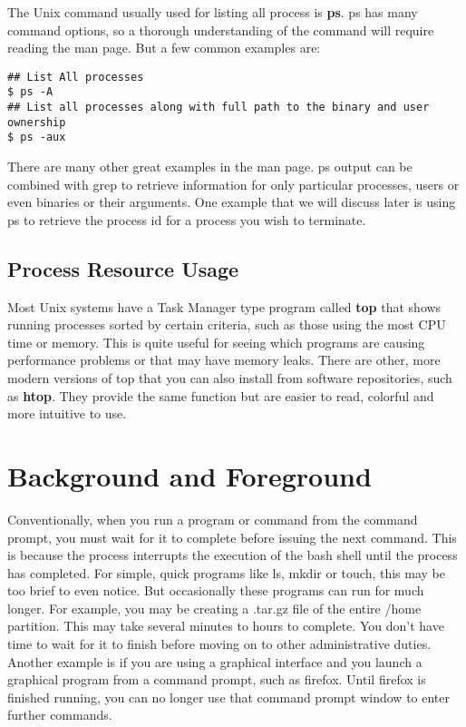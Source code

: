 The Unix command usually used for listing all process is \textbf{ps}.  ps has many command options, so a thorough understanding of the command will require reading the man page.  But a few common examples are:

\begin{verbatim}
## List All processes
$ ps -A
## List all processes along with full path to the binary and user ownership
$ ps -aux
\end{verbatim}

There are many other great examples in the man page.  ps output can be combined with grep to retrieve information for only particular processes, users or even binaries or their arguments.  One example that we will discuss later is using ps to retrieve the process id for a process you wish to terminate.

\subsection{Process Resource Usage}

Most Unix systems have a Task Manager type program called \textbf{top} that shows running processes sorted by certain criteria, such as those using the most CPU time or memory.  This is quite useful for seeing which programs are causing performance problems or that may have memory leaks.  There are other, more modern versions of top that you can also install from software repositories, such as \textbf{htop}.  They provide the same function but are easier to read, colorful and more intuitive to use.

\section{Background and Foreground}

Conventionally, when you run a program or command from the command prompt, you must wait for it to complete before issuing the next command.  This is because the process interrupts the execution of the bash shell until the process has completed.  For simple, quick programs like ls, mkdir or touch, this may be too brief to even notice.  But occasionally these programs can run for much longer.  For example, you may be creating a .tar.gz file of the entire /home partition.  This may take several minutes to hours to complete.  You don't have time to wait for it to finish before moving on to other administrative duties.\\

Another example is if you are using a graphical interface and you launch a graphical program from a command prompt, such as firefox.  Until firefox is finished running, you can no longer use that command prompt window to enter further commands.\\

